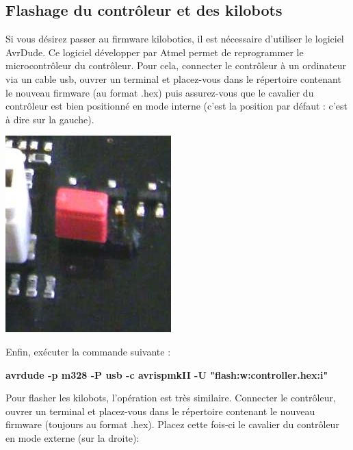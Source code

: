 \documentclass[a4paper,8pt]{report}
\begin{document}
\subsection*{Flashage du contr\^oleur et des kilobots}\label{sec:name}

Si vous d\'esirez passer au firmware kilobotics, il est n\'ecessaire d'utiliser le logiciel AvrDude. Ce logiciel d\'evelopper par Atmel permet de reprogrammer le microcontr\^oleur du contr\^oleur. Pour cela, connecter le contr\^oleur \`a un ordinateur via un cable usb, ouvrer un terminal et placez-vous dans le r\'epertoire contenant le nouveau firmware (au format .hex) puis assurez-vous que le cavalier du contr\^oleur est bien positionn\'e en mode interne (c'est la position par d\'efaut : c'est \`a dire sur la gauche). \\

\begin{center}
  \includegraphics[scale=0.7]{images/flashI.png}
\end{center}

Enfin, ex\'ecuter la commande suivante :\\

\begin{center}
  \textbf{avrdude -p m328  -P usb -c avrispmkII -U "flash:w:controller.hex:i"}
\end{center}

Pour flasher les kilobots, l'op\'eration est tr\`es similaire. Connecter le contr\^oleur, ouvrer un terminal et placez-vous dans le r\'epertoire contenant le nouveau firmware (toujours au format .hex). Placez cette fois-ci le cavalier du contr\^oleur en mode externe (sur la droite): \\
\end{document}
